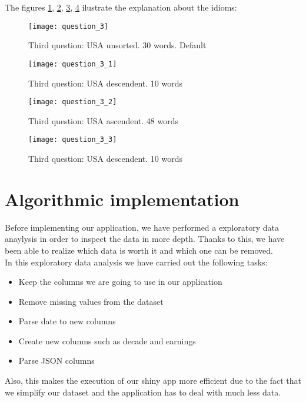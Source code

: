 The figures \ref{fig:3rd_question}, \ref{fig:3rd_question_1}, \ref{fig:3rd_question_2}, \ref{fig:3rd_question_3} ilustrate the explanation about the idioms: 

\begin{figure}[H]
	\texttt{[image: question\_3]}
	\caption{Third question: USA unsorted. 30 words. Default}
	\label{fig:3rd_question}
\end{figure}

\begin{figure}[H]
	\texttt{[image: question\_3\_1]}
	\caption{Third question: USA descendent. 10 words}
	\label{fig:3rd_question_1}
\end{figure}

\begin{figure}[H]
	\texttt{[image: question\_3\_2]}
	\caption{Third question: USA ascendent. 48 words}
	\label{fig:3rd_question_2}
\end{figure}

\begin{figure}[H]
	\texttt{[image: question\_3\_3]}
	\caption{Third question: USA descendent. 10 words}
	\label{fig:3rd_question_3}
\end{figure}

\section{Algorithmic implementation}

Before implementing our application, we have performed a exploratory data anaylysis in order to inspect the data in more depth. Thanks to this, we have been able to realize which data is worth it and which one can be removed.\\ 

In this exploratory data analysis we have carried out the following tasks:

\begin{itemize}
	\item Keep the columns we are going to use in our application
	\item Remove missing values from the dataset
	\item Parse date to new columns
	\item Create new columns such as decade and earnings
	\item Parse JSON columns
\end{itemize}

Also, this makes the execution of our shiny app more efficient due to the fact that we simplify our dataset and the application has to deal with much less data.\\

